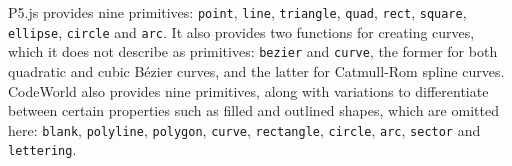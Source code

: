 \documentclass[../main.tex]{subfiles}
\begin{document}
                P5.js provides nine primitives: \texttt{point}, \texttt{line},
                    \texttt{triangle}, \texttt{quad}, \texttt{rect}, \texttt{square},
                    \texttt{ellipse}, \texttt{circle} and \texttt{arc}.
                It also provides two functions for creating curves, which it does not describe
                    as primitives: \texttt{bezier} and \texttt{curve}, the former for both
                    quadratic and cubic Bézier curves, and the latter for Catmull-Rom spline
                    curves.
                CodeWorld also provides nine primitives, along with variations to differentiate
                    between certain properties such as filled and outlined shapes, which are
                    omitted here: \texttt{blank}, \texttt{polyline}, \texttt{polygon},
                    \texttt{curve}, \texttt{rectangle}, \texttt{circle}, \texttt{arc},
                    \texttt{sector} and \texttt{lettering}.
\end{document}

